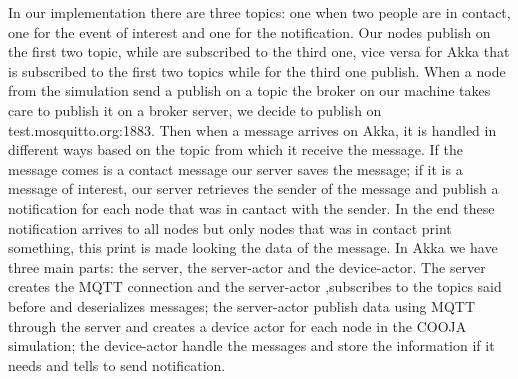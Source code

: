 \documentclass[10pt]{article}
\begin{document}
	In our implementation there are three topics: one when two people are in contact, one for the event of interest and one for the notification. Our nodes publish on the first two topic, while are subscribed to the third one, vice versa for Akka that is subscribed to the first two topics while for the third one publish. When a node from the simulation send a publish on a topic the broker on our machine takes care to publish it on a broker server, we decide to publish on test.mosquitto.org:1883. Then when a message arrives on Akka, it is handled in different ways based on the topic from which it receive the message. If the message comes is a contact message our server saves the message; if it is a message of interest, our server retrieves the sender of the message and publish a notification for each node that was in cantact with the sender. In the end these notification arrives to all nodes but only nodes that was in contact print something, this print is made looking the data of the message.
	In Akka we have three main parts: the server, the server-actor and the device-actor. The server creates the MQTT connection and the server-actor ,subscribes to the topics said before and deserializes messages; the server-actor publish data using MQTT through the server and creates a device actor for each node in the COOJA simulation; the device-actor handle the messages and store the information if it needs and tells to send notification.        
	 
\end{document}
